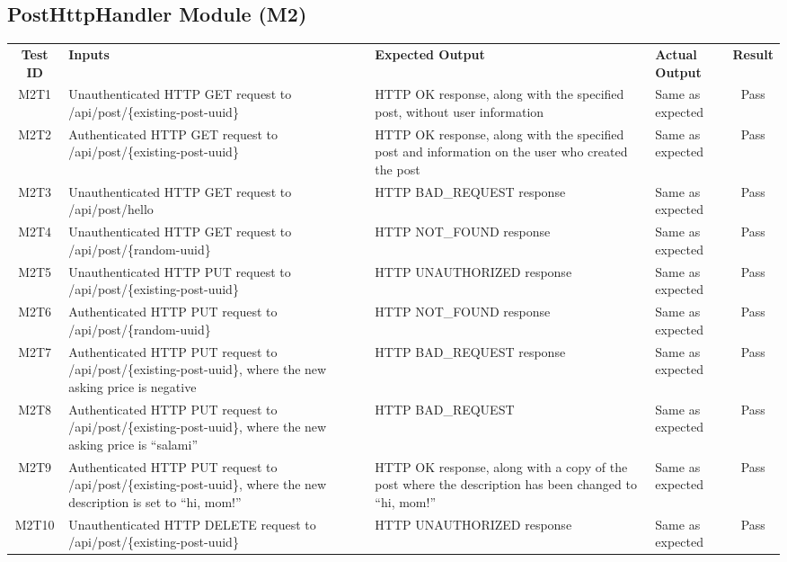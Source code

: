 \documentclass[fullpage]{article}
\begin{document}
\subsection{PostHttpHandler Module (M2)}
\begin{table}[H]
\flushleft
\begin{tabular}{|c|p{4.5cm}|p{3.6cm}|p{3.6cm}|c|}
\hline
 \rowcolor{lightgray} 
\textbf{Test ID} &\textbf{Inputs} &\textbf{Expected Output} &\textbf{Actual Output} &\textbf{Result}\\
M2T1 & Unauthenticated HTTP GET request to /api/post/\{existing-post-uuid\} & HTTP OK response, along with the specified post, without user information & Same as expected & Pass\\
\hline
M2T2 & Authenticated HTTP GET request to /api/post/\{existing-post-uuid\} & HTTP OK response, along with the specified post and information on the user who created the post  & Same as expected & Pass \\
\hline
M2T3 & Unauthenticated HTTP GET request to /api/post/hello & HTTP BAD\_REQUEST response  & Same as expected & Pass \\
\hline
M2T4 & Unauthenticated HTTP GET request to /api/post/\{random-uuid\} & HTTP NOT\_FOUND response  & Same as expected & Pass \\
\hline
M2T5 & Unauthenticated HTTP PUT request to /api/post/\{existing-post-uuid\} & HTTP UNAUTHORIZED response & Same as expected & Pass \\
\hline
M2T6 & Authenticated HTTP PUT request to /api/post/\{random-uuid\} & HTTP NOT\_FOUND response & Same as expected & Pass \\
\hline
M2T7 & Authenticated HTTP PUT request to /api/post/\{existing-post-uuid\}, where the new asking price is negative & HTTP BAD\_REQUEST response & Same as expected & Pass \\
\hline
M2T8 & Authenticated HTTP PUT request to /api/post/\{existing-post-uuid\}, where the new asking price is ``salami'' & HTTP BAD\_REQUEST & Same as expected & Pass \\
\hline
M2T9 & Authenticated HTTP PUT request to /api/post/\{existing-post-uuid\}, where the new description is set to ``hi, mom!'' & HTTP OK response, along with a copy of the post where the description has been changed to ``hi, mom!'' & Same as expected & Pass \\
\hline
M2T10 & Unauthenticated HTTP DELETE request to /api/post/\{existing-post-uuid\} & HTTP UNAUTHORIZED response & Same as expected & Pass \\
\hline
\end{tabular}
\end{table}
\end{document}
